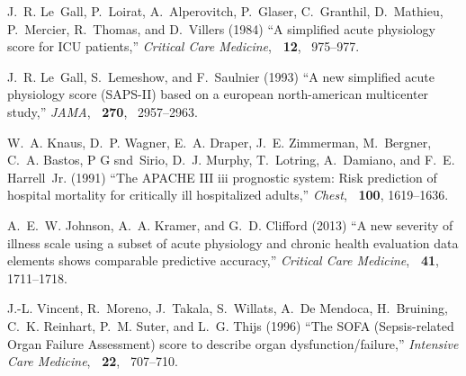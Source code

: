\documentclass{bioinfo}
\begin{document}
\begin{thebibliography}{}

J.~R. Le~Gall, P.~Loirat, A.~Alperovitch, P.~Glaser, C.~Granthil, D.~Mathieu,
  P.~Mercier, R.~Thomas, and D.~Villers (1984) ``A simplified acute physiology score
  for {ICU} patients,'' {\it Critical Care Medicine}, {\bf ~12}, ~975--977.

J.~R. Le~Gall, S.~Lemeshow, and F.~Saulnier (1993) ``A new simplified acute physiology
  score ({SAPS-II}) based on a european north-american multicenter study,''
  {\em JAMA}, {\bf ~270}, ~2957--2963.
 
W.~A. Knaus, D.~P. Wagner, E.~A. Draper, J.~E. Zimmerman, M.~Bergner, C.~A.
  Bastos, P G snd~Sirio, D.~J. Murphy, T.~Lotring, A.~Damiano, and F.~E.
  Harrell~Jr. (1991) ``The {APACHE III} iii prognostic system: Risk prediction of
  hospital mortality for critically ill hospitalized adults,'' {\em Chest},
  {\bf ~100}, 1619--1636.
 
A.~E.~W. Johnson, A.~A. Kramer, and G.~D. Clifford (2013) ``A new severity of illness
  scale using a subset of acute physiology and chronic health evaluation data
  elements shows comparable predictive accuracy,'' {\em Critical Care
  Medicine}, {\bf ~41}, 1711--1718.
  
J.-L. Vincent, R.~Moreno, J.~Takala, S.~Willats, A.~{De Mendoca}, H.~Bruining,
  C.~K. Reinhart, P.~M. Suter, and L.~G. Thijs (1996) ``{The SOFA (Sepsis-related
  Organ Failure Assessment) score to describe organ dysfunction/failure},''
  {\em Intensive Care Medicine}, {\bf ~22}, ~707--710.







\end{thebibliography}
\end{document}
